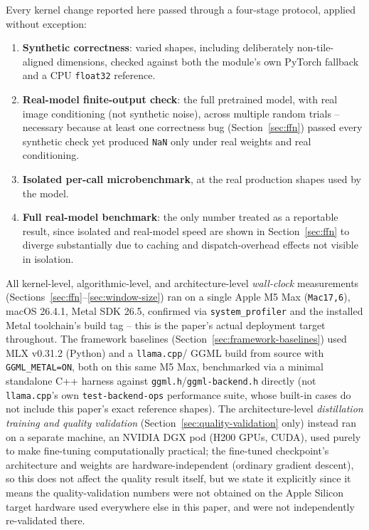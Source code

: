 \documentclass[11pt]{article}
\newcommand{\code}[1]{\texttt{#1}}
\begin{document}
Every kernel change reported here passed through a four-stage protocol, applied without exception:
\begin{enumerate}
    \item \textbf{Synthetic correctness}: varied shapes, including deliberately non-tile-aligned
    dimensions, checked against both the module's own PyTorch fallback and a CPU \code{float32}
    reference.
    \item \textbf{Real-model finite-output check}: the full pretrained model, with real image
    conditioning (not synthetic noise), across multiple random trials -- necessary because at
    least one correctness bug (Section~\ref{sec:ffn}) passed every synthetic check yet produced
    \code{NaN} only under real weights and real conditioning.
    \item \textbf{Isolated per-call microbenchmark}, at the real production shapes used by the
    model.
    \item \textbf{Full real-model benchmark}: the only number treated as a reportable result,
    since isolated and real-model speed are shown in Section~\ref{sec:ffn} to diverge
    substantially due to caching and dispatch-overhead effects not visible in isolation.
\end{enumerate}
All kernel-level, algorithmic-level, and architecture-level \emph{wall-clock} measurements
(Sections~\ref{sec:ffn}--\ref{sec:window-size}) ran on a single Apple M5 Max (\code{Mac17,6}),
macOS 26.4.1, Metal SDK 26.5, confirmed via \code{system\_profiler} and the installed Metal
toolchain's build tag -- this is the paper's actual deployment target throughout. The framework
baselines (Section~\ref{sec:framework-baselines}) used MLX v0.31.2 (Python) and a \code{llama.cpp}/
GGML build from source with \code{GGML\_METAL=ON}, both on this same M5 Max, benchmarked via a
minimal standalone C++ harness against \code{ggml.h}/\code{ggml-backend.h} directly (not
\code{llama.cpp}'s own \code{test-backend-ops} performance suite, whose built-in cases do not
include this paper's exact reference shapes). The
architecture-level \emph{distillation training and quality validation}
(Section~\ref{sec:quality-validation} only) instead ran on a separate machine, an NVIDIA
DGX pod (H200 GPUs, CUDA), used purely to make fine-tuning computationally practical; the
fine-tuned checkpoint's architecture and weights are hardware-independent (ordinary gradient
descent), so this does not affect the quality result itself, but we state it explicitly since it
means the quality-validation numbers were not obtained on the Apple Silicon target hardware used
everywhere else in this paper, and were not independently re-validated there.
\end{document}
